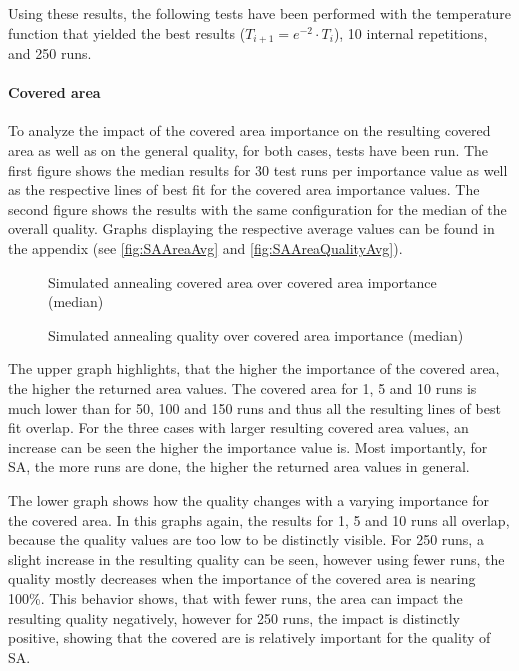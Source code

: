 Using these results, the following tests have been performed with the temperature function that yielded the best results ($T_{i+1} = e^{-2} \cdot T_i$), 10 internal repetitions, and 250 runs.


\paragraph{Covered area}

To analyze the impact of the covered area importance on the resulting covered area as well as on the general quality, for both cases, tests have been run.
The first figure shows the median results for 30 test runs per importance value as well as the respective lines of best fit for the covered area importance values.
The second figure shows the results with the same configuration for the median of the overall quality.
Graphs displaying the respective average values can be found in the appendix (see \ref{fig:SAAreaAvg} and \ref{fig:SAAreaQualityAvg}).



\begin{figure}[H]
	\centering
	
	\caption{Simulated annealing covered area over covered area importance (median)}
	\label{fig:SAAreaMed}
\end{figure}

\begin{figure}[H]
	\centering
	
	\caption{Simulated annealing quality over covered area importance (median)}
	\label{fig:SAAreaQualityMed}
\end{figure}


The upper graph highlights, that the higher the importance of the covered area, the higher the returned area values.
The covered area for 1, 5 and 10 runs is much lower than for 50, 100 and 150 runs and thus all the resulting lines of best fit overlap.
For the three cases with larger resulting covered area values, an increase can be seen the higher the importance value is.
Most importantly, for SA, the more runs are done, the higher the returned area values in general.


The lower graph shows how the quality changes with a varying importance for the covered area.
In this graphs again, the results for 1, 5 and 10 runs all overlap, because the quality values are too low to be distinctly visible.
For 250 runs, a slight increase in the resulting quality can be seen, however using fewer runs, the quality mostly decreases when the importance of the covered area is nearing 100\%.
This behavior shows, that with fewer runs, the area can impact the resulting quality negatively, however for 250 runs, the impact is distinctly positive, showing that the covered are is relatively important for the quality of SA.


